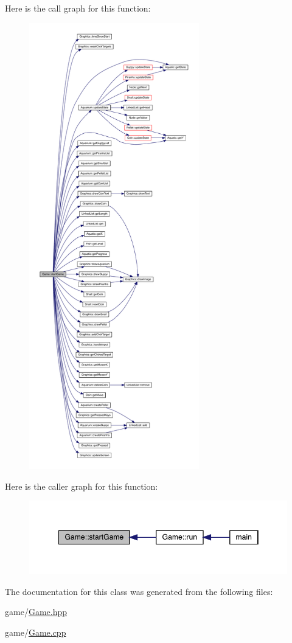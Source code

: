 Here is the call graph for this function\+:\nopagebreak
\begin{figure}[H]
\begin{center}
\leavevmode
\includegraphics[height=550pt]{class_game_ae8638ccdb0ef3bf39a6affa30aa1258f_cgraph}
\end{center}
\end{figure}
Here is the caller graph for this function\+:\nopagebreak
\begin{figure}[H]
\begin{center}
\leavevmode
\includegraphics[width=348pt]{class_game_ae8638ccdb0ef3bf39a6affa30aa1258f_icgraph}
\end{center}
\end{figure}


The documentation for this class was generated from the following files\+:\begin{DoxyCompactItemize}
\item 
game/\mbox{\hyperlink{_game_8hpp}{Game.\+hpp}}\item 
game/\mbox{\hyperlink{_game_8cpp}{Game.\+cpp}}\end{DoxyCompactItemize}
